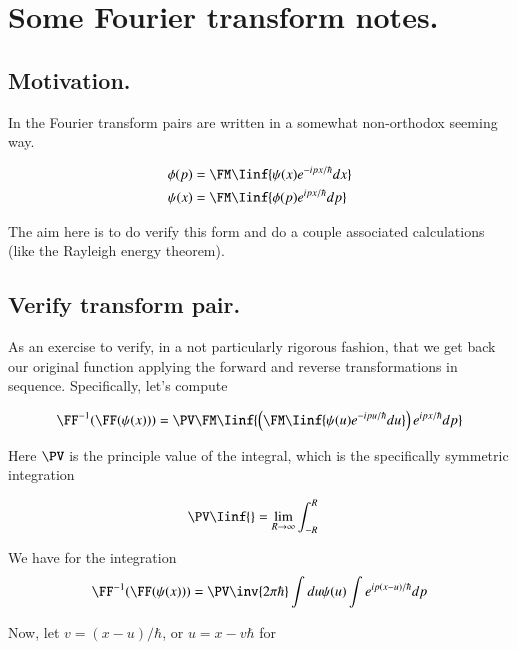\chapter{Some Fourier transform notes.}\label{chap:PJqmFourier}
\date{Jan 09, 2009.  fourierTx.tex}

\section{Motivation. }

In \cite{mcmahon2005qmd} the Fourier transform pairs are written in a somewhat 
non-orthodox seeming way.

\begin{align*}
\phi(p) &= \FM \Iinf{\psi(x) e^{-ipx/\hbar} dx} \\
\psi(x) &= \FM \Iinf{\phi(p) e^{ipx/\hbar} dp} \\
\end{align*}

The aim here is to do verify this form and do a couple associated calculations (like the Rayleigh energy theorem).

\section{Verify transform pair. }

As an exercise to verify, in a not particularly rigorous fashion, that we get back our original function applying the forward and reverse transformations
in sequence.  Specifically, let's compute

\begin{align*}
\FF^{-1}(\FF(\psi(x)))
&= \PV \FM \Iinf{\left(\FM \Iinf{\psi(u) e^{-ipu/\hbar} du}\right) e^{ipx/\hbar} dp} \\
\end{align*}

Here $\PV$ is the principle value of the integral, which is the specifically symmetric integration

\begin{align*}
\PV \Iinf{} &= \lim_{R \rightarrow \infty} \int_{-R}^R
\end{align*}

We have for the integration
\begin{align*}
\FF^{-1}(\FF(\psi(x)))
&= \PV \inv{{2\pi\hbar}} \int du \psi(u) \int e^{i p (x-u)/\hbar} dp \\
\end{align*}

Now, let $v = (x-u)/\hbar$, or $u=x-v\hbar$ for

